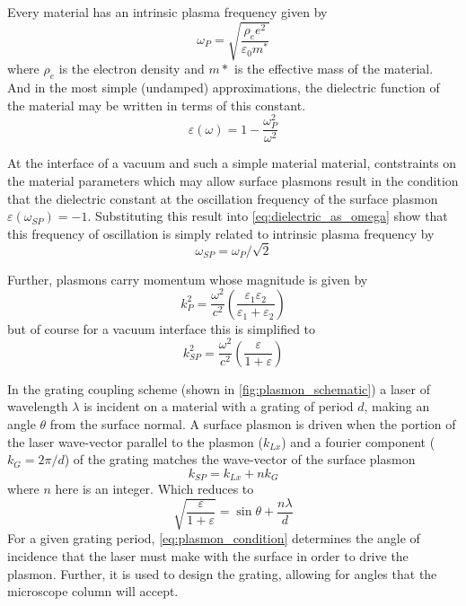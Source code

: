 Every material has an intrinsic plasma frequency given by 
\begin{equation}
  \omega_{P} = \sqrt{\frac{\rho_{e} e^2}{\varepsilon_{0} m^*}}
\end{equation}
where $\rho_{e}$ is the electron density and $m*$ is the effective mass of the material.
And in the most simple (undamped) approximations, the dielectric function of the material may be written in terms of this constant.
\begin{equation} \label{eq:dielectric_as_omega}
  \varepsilon(\omega) = 1 - \frac{ \omega_{P}^2 }{ \omega^2 }
\end{equation}

At the interface of a vacuum and such a simple material material, contstraints on the material parameters which may allow surface plasmons result in the condition that the dielectric constant at the oscillation frequency of the surface plasmon $ \varepsilon(\omega_{SP}) = -1 $.
Substituting this result into \ref{eq:dielectric_as_omega} show that this frequency of oscillation is simply related to intrinsic plasma frequency by
\begin{equation}
  \omega_{SP} = \omega_{P} / \sqrt{2}
\end{equation}

Further, plasmons carry momentum whose magnitude is given by
\begin{equation}
  k_{P}^2 = \frac{\omega^2}{c^2} \left( \frac{\varepsilon_{1} \varepsilon_{2}}{\varepsilon_{1} + \varepsilon_{2}} \right)
\end{equation}
but of course for a vacuum interface this is simplified to 
\begin{equation}
  k_{SP}^2 = \frac{\omega^2}{c^2} \left( \frac{ \varepsilon }{ 1 + \varepsilon } \right)
\end{equation}

In the grating coupling scheme (shown in \ref{fig:plasmon_schematic}) a laser of wavelength $\lambda$ is incident on a material with a grating of period $d$, making an angle $\theta$ from the surface normal. A surface plasmon is driven when the portion of the laser wave-vector parallel to the plasmon ($k_{Lx}$) and a fourier component ($k_{G} = 2 \pi / d$) of the grating matches the wave-vector of the surface plasmon
\begin{equation}
  k_{SP} = k_{Lx} + n k_{G}
\end{equation}
where $n$ here is an integer.
Which reduces to 
\begin{equation} \label{eq:plasmon_condition}
  \sqrt{ \frac{ \varepsilon }{ 1 + \varepsilon } } = \sin \theta + \frac{ n \lambda }{ d }
\end{equation}
For a given grating period, \ref{eq:plasmon_condition} determines the angle of incidence that the laser must make with the surface in order to drive the plasmon.
Further, it is used to design the grating, allowing for angles that the microscope column will accept.

